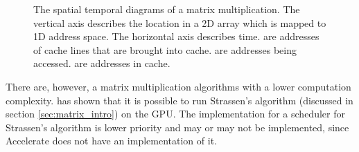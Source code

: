 \documentclass{article}
\begin{document}
\begin{figure}
{
        \label{fig:st_matrix_column}
    }

    \caption{
        The spatial temporal diagrams of a matrix multiplication. The vertical axis describes the location in a 2D array which is mapped to 1D address space. The horizontal axis describes time.  are addresses of cache lines that are brought into cache.  are addresses being accessed.  are addresses in cache.
    }
    \label{fig:st_matrix}
\end{figure}

There are, however, a matrix multiplication algorithms with a lower computation complexity. 
\citet{li2011strassen} has shown that it is possible to run Strassen's algorithm (discussed in section \ref{sec:matrix_intro}) on the GPU.
The implementation for a scheduler for Strassen's algorithm is lower priority and may or may not be implemented, since Accelerate does not have an implementation of it.
\end{document}
